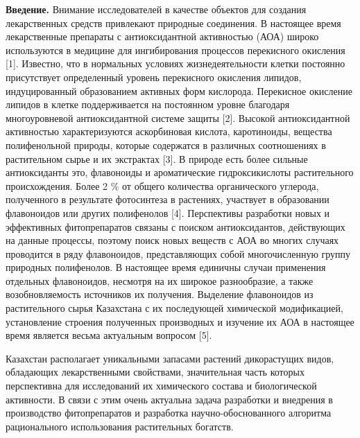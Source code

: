{\bfseries Введение.} Внимание исследователей в качестве объектов для
создания лекарственных средств привлекают природные соединения. В
настоящее время лекарственные препараты с антиоксидантной активностью
(АОА) широко используются в медицине для ингибирования процессов
перекисного окисления {[}1{]}. Известно, что в нормальных условиях
жизнедеятельности клетки постоянно присутствует определенный уровень
перекисного окисления липидов, индуцированный образованием активных форм
кислорода. Перекисное окисление липидов в клетке поддерживается на
постоянном уровне благодаря многоуровневой антиоксидантной системе
защиты {[}2{]}. Высокой антиоксидантной активностью характеризуются
аскорбиновая кислота, каротиноиды, вещества полифенольной природы,
которые содержатся в различных соотношениях в растительном сырье и их
экстрактах {[}3{]}. В природе есть более сильные антиоксиданты это,
флавоноиды и ароматические гидроксикислоты растительного происхождения.
Более 2 \% от общего количества органического углерода, полученного в
результате фотосинтеза в растениях, участвует в образовании флавоноидов
или других полифенолов {[}4{]}. Перспективы разработки новых и
эффективных фитопрепаратов связаны с поиском антиоксидантов, действующих
на данные процессы, поэтому поиск новых веществ с АОА во многих случаях
проводится в ряду флавоноидов, представляющих собой многочисленную
группу природных полифенолов. В настоящее время единичны случаи
применения отдельных флавоноидов, несмотря на их широкое разнообразие, а
также возобновляемость источников их получения. Выделение флавоноидов из
растительного сырья Казахстана с их последующей химической модификацией,
установление строения полученных производных и изучение их АОА в
настоящее время является весьма актуальным вопросом {[}5{]}.

Казахстан располагает уникальными запасами растений дикорастущих видов,
обладающих лекарственными свойствами, значительная часть которых
перспективна для исследований их химического состава и биологической
активности. В связи с этим очень актуальна задача разработки и внедрения
в производство фитопрепаратов и разработка научно-обоснованного
алгоритма рационального использования растительных богатств.

